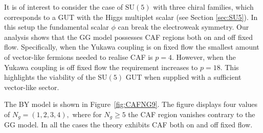 It is of interest to consider the case of $\mathrm{SU}(5)$ with three chiral families, which corresponds to a GUT with the Higgs multiplet scalar \cite{Georgi:1974yf} (see Section \ref{sec:SU5}). In this setup the fundamental scalar $\phi$ can break the electroweak symmetry. Our analysis shows that the GG model possesses CAF regions both on and off fixed flow. Specifically, when the Yukawa coupling is on fixed flow the smallest amount of vector-like fermions needed to realise CAF is $p=4$. However, when the Yukawa coupling is off fixed flow the requirement increases to $p=18$. This highlights the viability of the $\mathrm{SU}(5)$ GUT when supplied with a sufficient vector-like sector. 

The BY model is shown in Figure~\ref{fig:CAFNG9}. The figure displays four values of $N_g=(1,2,3,4), $ where for $N_g\ge 5$ the CAF region vanishes contrary to the GG model. In all the cases the theory exhibits CAF both on and off fixed flow. 











